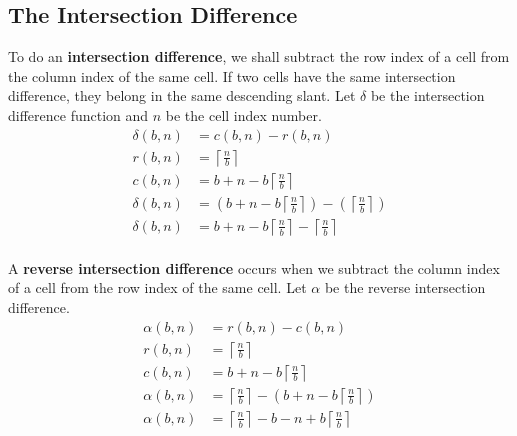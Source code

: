 \documentclass[letterpaper, twoside,12pt]{article}
\begin{document}
    \subsection{The Intersection Difference} \label{intersection_diff}
    To do an \textbf{intersection difference}, we shall subtract the row index of a cell from the column index of the same cell. If two cells have the same intersection difference, they belong in the same descending slant. Let $\delta$ be the intersection difference function and $n$ be the cell index number.
    \begin{equation}
        \begin{split}
            \delta(b,n) &= c(b,n) - r(b,n)\\
            r(b,n) &= \left\lceil \frac{n}{b} \right\rceil \\
            c(b,n) &= b + n - b\left\lceil \frac{n}{b} \right\rceil \\
            \delta(b,n) &= (b + n - b\left\lceil \frac{n}{b} \right\rceil) - (\left\lceil \frac{n}{b} \right\rceil)\\
            \delta(b,n) &= b + n - b\left\lceil \frac{n}{b} \right\rceil - \left\lceil \frac{n}{b} \right\rceil\\
        \end{split}
    \end{equation}

    A \textbf{reverse intersection difference} occurs when we subtract the column index of a cell from the row index of the same cell. Let $\alpha$ be the reverse intersection difference.
    \begin{equation}
        \begin{split}
            \alpha(b,n) &= r(b,n) - c(b,n)\\
            r(b,n) &= \left\lceil \frac{n}{b} \right\rceil \\
            c(b,n) &= b + n - b\left\lceil \frac{n}{b} \right\rceil \\
            \alpha(b,n) &= \left\lceil \frac{n}{b} \right\rceil - (b + n - b\left\lceil \frac{n}{b} \right\rceil)\\
            \alpha(b,n) &= \left\lceil \frac{n}{b} \right\rceil - b - n + b\left\lceil \frac{n}{b} \right\rceil
        \end{split}
    \end{equation}
\end{document}
